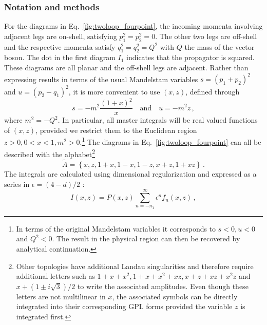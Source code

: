\documentclass[a4paper,11pt]{article}
\begin{document}
\subsubsection{Notation and methods}\label{sec:two_loops_methods}
 For the diagrams in Eq.~\eqref{fig:twoloop_fourpoint}, the incoming momenta involving adjacent legs are on-shell, satisfying $p_1^2=p_2^2=0$. 
 The other two legs are off-shell and the respective momenta satisfy $q_1^2=q_2^2=Q^2$ with $Q$ the mass of the vector boson. The dot in the first diagram $I_1$ indicates that the propagator is squared.
 These diagrams are all planar and the off-shell legs are adjacent. Rather than expressing results in terms of the usual Mandelstam variables $s=(p_1+p_2)^2$ and $u=(p_2-q_1)^2$, it is more convenient to use $(x,z)$, defined through
\begin{equation}\label{eq:two_loop_kinmatics}
    s=-m^2\frac{(1+x)^2}{x} \quad \text{and} \quad u=-m^2 z \,,
\end{equation}
where $m^2=-Q^2$. In particular, all master integrals will be real valued functions of $(x,z)$, provided we restrict them to the 
Euclidean region $z>0, 0<x<1, m^2>0$.\footnote{In terms of the original Mandelstam variables it corresponds to $s<0, u<0$ and $Q^2<0$. The result in the physical region can then be recovered by analytical continuation.} 
The diagrams in Eq.~\eqref{fig:twoloop_fourpoint} can all be described with the alphabet\footnote{Other topologies have additional Landau singularities and therefore require additional letters such as $1+x+x^2, 1+x+x^2+xz, x+z+x z+x^2 z$ and $x+(1\pm i \sqrt{3})/2$ to write the associated amplitudes. Even though these letters are not multilinear in $x$, the associated symbols can be directly integrated into their corresponding GPL forms provided the variable $z$ is integrated first. 
}
\begin{equation}\label{eq:alphabet_two_loop}
    \tilde{A} = \left\{x, z, 1+x, 1-x, 1-z, x+z, 1+x z\right\} \,.
\end{equation}
The integrals are calculated using dimensional regularization and expressed as a series in $\epsilon=(4-d)/2$ : 
\begin{equation}
    I(x,z) = P(x,z) \sum_{n=-n_1}^\infty \epsilon^n f_n(x,z) \,,
\end{equation}
\end{document}
